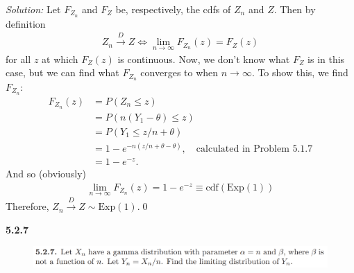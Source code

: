 \documentclass{book}
\theoremstyle{definition}
\newcommand{\nn}{\nonumber}
\begin{document}
\noindent \textit{Solution:} Let $F_{Z_n}$ and $F_Z$ be, respectively, the cdfs of $Z_n$ and $Z$. Then by definition 
\begin{align}
Z_n \xrightarrow{D} Z \iff \lim_{n\to \infty} F_{Z_n}(z) = F_Z(z)
\end{align}
for all $z$ at which $F_Z(z)$ is continuous. Now, we don't know what $F_Z$ is in this case, but we can find what $F_{Z_n}$ converges to when $n\to \infty$. To show this, we find $F_{Z_n}$:
\begin{align}
F_{Z_n}(z) &= P(Z_n \leq z)\nn\\
&= P(n(Y_1 - \theta) \leq z)\nn\\
&= P(Y_1 \leq z/n + \theta)\nn\\
&= 1 - e^{-n(z/n+ \theta - \theta)}, \quad \text{calculated in Problem 5.1.7}\nn\\
&= 1 - e^{-z}.
\end{align}
And so (obviously)
\begin{align}
\lim_{n\to \infty} F_{Z_n}(z) = 1 - e^{-z} \equiv \text{cdf}(\text{Exp}(1))
\end{align}
Therefore, $Z_n \xrightarrow{D} Z \sim \text{Exp}(1)$.\qed



\newpage




\noindent \textbf{5.2.7}

\begin{figure}[!htb]
	\includegraphics[scale=0.25]{527}
\end{figure}
\end{document}
